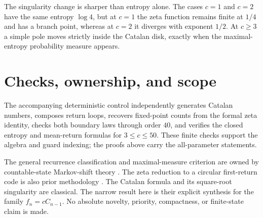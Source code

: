\documentclass[11pt,a4paper]{amsart}
\theoremstyle{definition}
\theoremstyle{remark}
\begin{document}
The singularity change is sharper than entropy alone.  The cases $c=1$ and
$c=2$ have the same entropy $\log4$, but at $c=1$ the zeta function remains
finite at $1/4$ and has a branch point, whereas at $c=2$ it diverges with
exponent $1/2$.  At $c\geq3$ a simple pole moves strictly inside the Catalan
disk, exactly when the maximal-entropy probability measure appears.

\section{Checks, ownership, and scope}

The accompanying deterministic control independently generates Catalan
numbers, composes return loops, recovers fixed-point counts from the formal
zeta identity, checks both boundary laws through order $40$, and verifies
the closed entropy and mean-return formulas for $3\leq c\leq50$.  These
finite checks support the algebra and guard indexing; the proofs above carry
the all-parameter statements.

The general recurrence classification and maximal-measure criterion are
owned by countable-state Markov-shift theory
\cite{GurevichSavchenko1998,Sarig1999}.  The zeta reduction to a circular
first-return code is also prior methodology \cite{Keller1991}.  The Catalan
formula and its square-root singularity are classical.  The narrow result
here is their explicit synthesis for the family $f_n=cC_{n-1}$.  No absolute
novelty, priority, compactness, or finite-state claim is made.



\end{document}
